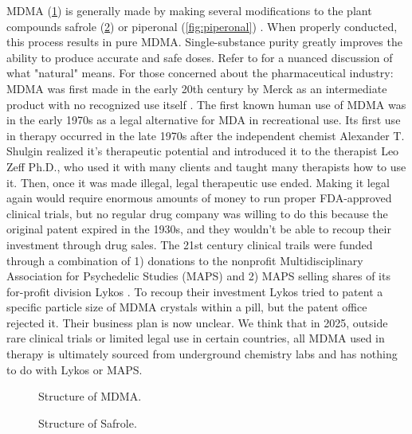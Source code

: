 \documentclass[12pt,letterpaper]{book}
\begin{document}
\begin{itemize}
        MDMA (\ref{fig:mdma}) is generally made by making several modifications to the plant compounds safrole (\ref{fig:safrole}) or piperonal (\ref{fig:piperonal}) \cite{worldDrugReport,euMDMA}. When properly conducted, this process results in pure MDMA. Single-substance purity greatly improves the ability to produce accurate and safe doses. Refer to \textcite{ruggeriNatural} for a nuanced discussion of what "natural" means. For those concerned about the pharmaceutical industry: MDMA was first made in the early 20th century by Merck as an intermediate product with no recognized use itself \cite{passieHistory}. The first known human use of MDMA was in the early 1970s as a legal alternative for MDA in recreational use. Its first use in therapy occurred in the late 1970s after the independent chemist Alexander T. Shulgin realized it's therapeutic potential and introduced it to the therapist Leo Zeff Ph.D., who used it with many clients and taught many therapists how to use it. Then, once it was made illegal, legal therapeutic use ended. Making it legal again would require enormous amounts of money to run proper FDA-approved clinical trials, but no regular drug company was willing to do this because the original patent expired in the 1930s, and they wouldn't be able to recoup their investment through drug sales. The 21st century clinical trails were funded through a combination of 1) donations to the nonprofit Multidisciplinary Association for Psychedelic Studies (MAPS) and 2) MAPS selling shares of its for-profit division Lykos \cite{lykosPatents}. To recoup their investment Lykos tried to patent a specific particle size of MDMA crystals within a pill, but the patent office rejected it. Their business plan is now unclear. We think that in 2025, outside rare clinical trials or limited legal use in certain countries, all MDMA used in therapy is ultimately sourced from underground chemistry labs and has nothing to do with Lykos or MAPS.
        \FloatBarrier
        \begin{figure}[htbp]
            \centering
            \caption{Structure of MDMA.}
            \label{fig:mdma}
        \end{figure}
        \begin{figure}[htbp]
            \centering
            \caption{Structure of Safrole.}
            \label{fig:safrole}
        \end{figure}
        \begin{figure}[htbp]

\end{figure}
\end{itemize}
\end{document}
